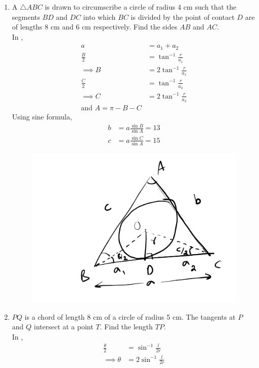 \begin{enumerate}[label=\thesubsection.\arabic*,ref=\thesubsection.\theenumi]
\begin{figure}[H]
\begin{center}
	\end{center}
	\caption{}
	\label{fig:ncert-circ-6}	
\end{figure}
%
\item A $\triangle ABC$ is drawn to circumscribe a circle of radius 4 cm such that the segments $BD$ and $DC$ into which $BC$ is divided by the point of contact $D$ are of lengths 8 cm and 6 cm respectively. Find the sides $AB$ and $AC$.
\\
\solution
	In , 
\begin{align}
	a &= a_1+a_2
	\\
	\frac{B}{2} &= \tan^{-1}\frac{r}{a_1}
	\\
	\implies B &= 2\tan^{-1}\frac{r}{a_1}
	\\
	\frac{C}{2} &= \tan^{-1}\frac{r}{a_2}
	\\
	\implies C &= 2\tan^{-1}\frac{r}{a_2}
	\\
	\text{and } A = \pi - B-C
\end{align}
Using sine formula,
\begin{align}
	b &= a\frac{\sin B}{\sin A}=13
	\\
	c &= a\frac{\sin C}{\sin A}=15
\end{align}
\begin{figure}[H]
	\begin{center}
		{\includegraphics[width=0.6\columnwidth]{figs/ncert/circle/7.png}}
	\end{center}
	\caption{}
	\label{fig:ncert-circ-7}	
\end{figure}
\item $PQ$ is a chord of length 8 cm of a circle of radius 5 cm. The tangents at $P$ and $Q$ intersect at a point $T$. Find the length $TP$.
\\
\solution
	In , 
\begin{align}
	\frac{\theta}{2} &= \sin^{-1}\frac{l}{2r}
	\\
	\implies \theta &= 2\sin^{-1}\frac{l}{2r}

\end{align}
\end{enumerate}
